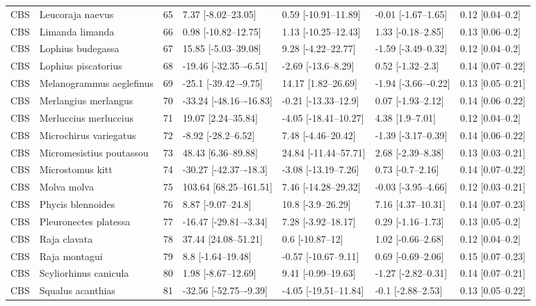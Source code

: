 \begin{longtable}[t]{lllllll}
CBS & Leucoraja naevus & 65 & 7.37 [-8.02–23.05] & 0.59 [-10.91–11.89] & -0.01 [-1.67–1.65] & 0.12 [0.04–0.2]\\
\addlinespace
CBS & Limanda limanda & 66 & 0.98 [-10.82–12.75] & 1.13 [-10.25–12.43] & 1.33 [-0.18–2.85] & 0.13 [0.06–0.2]\\
CBS & Lophius budegassa & 67 & 15.85 [-5.03–39.08] & 9.28 [-4.22–22.77] & -1.59 [-3.49–0.32] & 0.12 [0.04–0.2]\\
CBS & Lophius piscatorius & 68 & -19.46 [-32.35–-6.51] & -2.69 [-13.6–8.29] & 0.52 [-1.32–2.3] & 0.14 [0.07–0.22]\\
CBS & Melanogrammus aeglefinus & 69 & -25.1 [-39.42–-9.75] & 14.17 [1.82–26.69] & -1.94 [-3.66–-0.22] & 0.13 [0.05–0.21]\\
CBS & Merlangius merlangus & 70 & -33.24 [-48.16–-16.83] & -0.21 [-13.33–12.9] & 0.07 [-1.93–2.12] & 0.14 [0.06–0.22]\\
\addlinespace
CBS & Merluccius merluccius & 71 & 19.07 [2.24–35.84] & -4.05 [-18.41–10.27] & 4.38 [1.9–7.01] & 0.12 [0.04–0.2]\\
CBS & Microchirus variegatus & 72 & -8.92 [-28.2–6.52] & 7.48 [-4.46–20.42] & -1.39 [-3.17–0.39] & 0.14 [0.06–0.22]\\
CBS & Micromesistius poutassou & 73 & 48.43 [6.36–89.88] & 24.84 [-11.44–57.71] & 2.68 [-2.39–8.38] & 0.13 [0.03–0.21]\\
CBS & Microstomus kitt & 74 & -30.27 [-42.37–-18.3] & -3.08 [-13.19–7.26] & 0.73 [-0.7–2.16] & 0.14 [0.07–0.22]\\
CBS & Molva molva & 75 & 103.64 [68.25–161.51] & 7.46 [-14.28–29.32] & -0.03 [-3.95–4.66] & 0.12 [0.03–0.21]\\
\addlinespace
CBS & Phycis blennoides & 76 & 8.87 [-9.07–24.8] & 10.8 [-3.9–26.29] & 7.16 [4.37–10.31] & 0.14 [0.07–0.23]\\
CBS & Pleuronectes platessa & 77 & -16.47 [-29.81–-3.34] & 7.28 [-3.92–18.17] & 0.29 [-1.16–1.73] & 0.13 [0.05–0.2]\\
CBS & Raja clavata & 78 & 37.44 [24.08–51.21] & 0.6 [-10.87–12] & 1.02 [-0.66–2.68] & 0.12 [0.04–0.2]\\
CBS & Raja montagui & 79 & 8.8 [-1.64–19.48] & -0.57 [-10.67–9.11] & 0.69 [-0.69–2.06] & 0.15 [0.07–0.23]\\
CBS & Scyliorhinus canicula & 80 & 1.98 [-8.67–12.69] & 9.41 [-0.99–19.63] & -1.27 [-2.82–0.31] & 0.14 [0.07–0.21]\\
\addlinespace
CBS & Squalus acanthias & 81 & -32.56 [-52.75–-9.39] & -4.05 [-19.51–11.84] & -0.1 [-2.88–2.53] & 0.13 [0.05–0.22]\\

\end{longtable}
